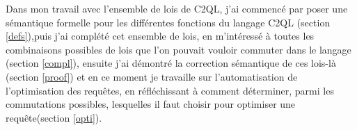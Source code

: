 Dans mon travail avec l'ensemble de lois de C2QL,
j'ai commencé par poser une sémantique formelle pour les différentes fonctions
du langage C2QL (section \ref{defs}),puis j'ai complété cet ensemble de lois,
en m'intéressé à toutes les combinaisons possibles de lois que l'on pouvait
vouloir commuter dans le langage (section \ref{compl}), ensuite 
j'ai démontré la correction sémantique de ces lois-là (section \ref{proof})
et en ce moment je travaille sur l'automatisation de l'optimisation 
des requêtes, en réfléchissant à comment déterminer, parmi les commutations possibles,
lesquelles il faut choisir pour optimiser une requête(section \ref{opti}).